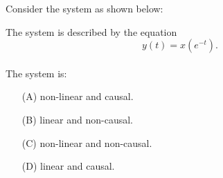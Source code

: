 \documentclass{article}
\begin{document}
Consider the system as shown below:
\begin{center}
\end{center}
The system is described by the equation
\[ y(t) = x(e^{-t}). \]\\
The system is:
\begin{itemize}
    \item[(A)] non-linear and causal.
    \item[(B)] linear and non-causal.
    \item[(C)] non-linear and non-causal.
    \item[(D)] linear and causal.
\end{itemize}
\end{document}
